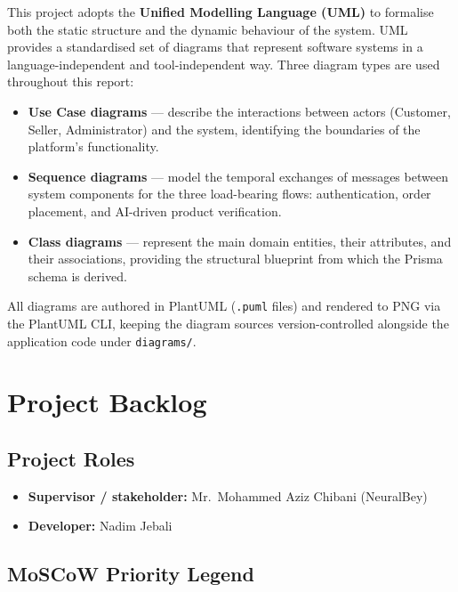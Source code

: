 \documentclass[12pt, a4paper, oneside]{report}
\begin{document}
This project adopts the \textbf{Unified Modelling Language (UML)} to
formalise both the static structure and the dynamic behaviour of the
system. UML provides a standardised set of diagrams that represent
software systems in a language-independent and tool-independent way.
Three diagram types are used throughout this report:

\begin{itemize}[leftmargin=*,itemsep=4pt]
  \item \textbf{Use Case diagrams} --- describe the interactions
        between actors (Customer, Seller, Administrator) and the
        system, identifying the boundaries of the platform's
        functionality.
  \item \textbf{Sequence diagrams} --- model the temporal exchanges
        of messages between system components for the three
        load-bearing flows: authentication, order placement, and
        AI-driven product verification.
  \item \textbf{Class diagrams} --- represent the main domain entities,
        their attributes, and their associations, providing the
        structural blueprint from which the Prisma schema is derived.
\end{itemize}

All diagrams are authored in PlantUML (\texttt{.puml} files) and
rendered to PNG via the PlantUML CLI, keeping the diagram sources
version-controlled alongside the application code under
\texttt{diagrams/}.

\section{Project Backlog}

\subsection{Project Roles}

\begin{itemize}[leftmargin=*,itemsep=4pt]
  \item \textbf{Supervisor / stakeholder:} Mr.\ Mohammed Aziz Chibani (NeuralBey)
  \item \textbf{Developer:} Nadim Jebali
\end{itemize}

\subsection{MoSCoW Priority Legend}
\end{document}
